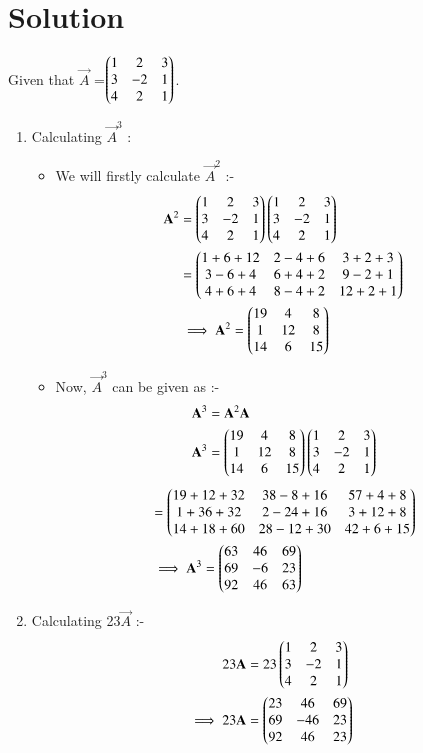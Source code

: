 \documentclass[journal,12pt,twocolumn]{IEEEtran}
\begin{document}
\section{Solution}
Given that $\vec{A}$ =$\begin{pmatrix}1&2&3\\3&-2&1\\4&2&1\end{pmatrix}$.
\begin{enumerate}
\item Calculating $\vec{A}^3$ :
\begin{itemize}
\item We will firstly calculate $\vec{A}^2$ :-
\begin{align}
\mathbf{A}^2&= \begin{pmatrix}1&2&3\\3&-2&1\\4&2&1\end{pmatrix}\begin{pmatrix}1&2&3\\3&-2&1\\4&2&1\end{pmatrix}
\\
&=\begin{pmatrix}1+6+12&2-4+6&3+2+3\\3-6+4&6+4+2&9-2+1\\4+6+4&8-4+2&12+2+1\end{pmatrix}
\\
&\implies\mathbf{A}^2= \begin{pmatrix}19&4&8\\1&12&8\\14&6&15\end{pmatrix}
\end{align}
\item Now, $\vec{A}^3$ can be given as :-
\begin{align}
 \mathbf{A}^3&=\mathbf{A}^2\mathbf{A}
 \\
 \mathbf{A}^3&=\begin{pmatrix}19&4&8\\1&12&8\\14&6&15\end{pmatrix}\begin{pmatrix}1&2&3\\3&-2&1\\4&2&1\end{pmatrix}
 \end{align}
 \begin{align}
 &=\begin{pmatrix}19+12+32&38-8+16&57+4+8\\1+36+32&2-24+16&3+12+8\\14+18+60&28-12+30&42+6+15\end{pmatrix}
 \\
 &\implies \mathbf{A}^3=\begin{pmatrix}63&46&69\\69&-6&23\\92&46&63\end{pmatrix}\label{eq:A3} 
\end{align}
\end{itemize}
\item Calculating 23$\vec{A}$ :-
\begin{align}
 23\vec{A}&=23\myvec{1&2&3\\3&-2&1\\4&2&1}
 \\
\implies 23\vec{A}&=\myvec{23&46&69\\69&-46&23\\92&46&23}\label{eq:23A}

\end{align}
\end{enumerate}
\end{document}
